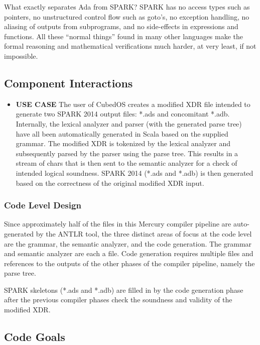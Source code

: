 \begin{itemize}
What exactly separates Ada from SPARK? SPARK has no access types such as pointers, no
unstructured control flow such as goto’s, no exception handling, no aliasing of outputs from
subprograms, and no side-effects in expressions and functions. All these “normal things” found
in many other languages make the formal reasoning and mathematical verifications much harder, at
very least, if not impossible.
\end{itemize}

\subsection{Component Interactions}

\begin{itemize}
\item \textbf{USE CASE} The user of CubedOS creates a modified XDR file intended to generate two
SPARK 2014 output files: *.ads and concomitant *.adb. Internally, the lexical analyzer and
parser (with the generated parse tree) have all been automatically generated in Scala based on
the supplied grammar. The modified XDR is tokenized by the lexical analyzer and subsequently
parsed by the parser using the parse tree. This results in a stream of chars that is then sent
to the semantic analyzer for a check of intended logical soundness. SPARK 2014 (*.ads and *.adb)
is then generated based on the correctness of the original modified XDR input.
\end{itemize}

\subsubsection{Code Level Design}

Since approximately half of the files in this Mercury compiler pipeline are auto-generated by
the ANTLR tool, the three distinct areas of focus at the code level are the grammar, the
semantic analyzer, and the code generation. The grammar and semantic analyzer are each a file.
Code generation requires multiple files and references to the outputs of the other phases of the
compiler pipeline, namely the parse tree.

SPARK skeletons (*.ads and *.adb) are filled in by the code generation phase after the previous
compiler phases check the soundness and validity of the modified XDR.

\subsection{Code Goals}

